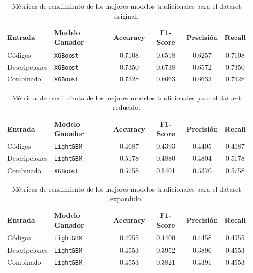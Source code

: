 \documentclass[12pt,a4paper,onecolumn,oneside]{report}
\begin{document}
\begin{table}[htbp]
\centering
\small
\renewcommand{\arraystretch}{1.25}
\begin{tabular}{|l|l|c|c|c|c|}
\hline
\rowcolor[RGB]{239,239,239}
\textbf{Entrada} & \textbf{Modelo Ganador} & \textbf{Accuracy} & \textbf{F1-Score} & \textbf{Precisión} & \textbf{Recall} \\ \hline

Códigos & \texttt{XGBoost} & 0.7108 & 0.6518 & 0.6257 & 0.7108 \\
Descripciones & \texttt{XGBoost} & 0.7350 & 0.6738 & 0.6572 & 0.7350 \\ 
Combinado & \texttt{XGBoost} & 0.7328 & 0.6663 & 0.6633 & 0.7328 \\ \hline


\end{tabular}
\caption{Métricas de rendimiento de los mejores modelos tradicionales para el dataset original.}
\label{tab:comparativa_boost_metricas_original}
\end{table}

\begin{table}[htbp]
\centering
\small
\renewcommand{\arraystretch}{1.25}
\begin{tabular}{|l|l|c|c|c|c|}
\hline
\rowcolor[RGB]{239,239,239}
\textbf{Entrada} & \textbf{Modelo Ganador} & \textbf{Accuracy} & \textbf{F1-Score} & \textbf{Precisión} & \textbf{Recall} \\ \hline

Códigos & \texttt{LightGBM} & 0.4687 & 0.4393 & 0.4405 & 0.4687 \\
Descripciones & \texttt{LightGBM} & 0.5178 & 0.4880 & 0.4804 & 0.5178 \\ 
Combinado & \texttt{XGBoost} & 0.5758 & 0.5401 & 0.5370 & 0.5758 \\ \hline


\end{tabular}
\caption{Métricas de rendimiento de los mejores modelos tradicionales para el dataset reducido.}
\label{tab:comparativa_boost_metricas_undersampling}
\end{table}


\begin{table}[htbp]
\centering
\small
\renewcommand{\arraystretch}{1.25}
\begin{tabular}{|l|l|c|c|c|c|}
\hline
\rowcolor[RGB]{239,239,239}
\textbf{Entrada} & \textbf{Modelo Ganador} & \textbf{Accuracy} & \textbf{F1-Score} & \textbf{Precisión} & \textbf{Recall} \\ \hline

Códigos & \texttt{LightGBM} & 0.4955 & 0.4400 & 0.4458 & 0.4955 \\
Descripciones & \texttt{LightGBM} & 0.4553 & 0.3952 & 0.3896 & 0.4553 \\ 
Combinado & \texttt{LightGBM} & 0.4553 &  0.3821 & 0.4391 & 0.4553 \\ \hline

\end{tabular}
\caption{Métricas de rendimiento de los mejores modelos tradicionales para el dataset expandido.}
\label{tab:comparativa_boost_metricas_vae}
\end{table}
\end{document}
